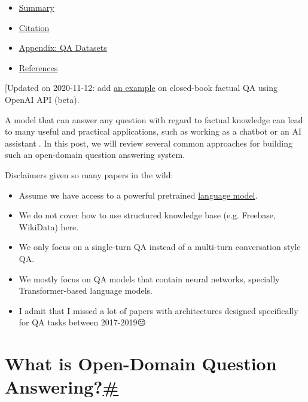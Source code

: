 \begin{itemize}
  \begin{itemize}
  \tightlist
  \item
    \hyperref[fast-maximum-inner-product-search-mips]{Fast Maximum Inner Product Search (MIPS)}
  \item
    \hyperref[language-model-pre-training]{Language Model Pre-training}
  \end{itemize}
\item
  \hyperref[summary]{Summary}
\item
  \hyperref[citation]{Citation}
\item
  \hyperref[appendix-qa-datasets]{Appendix: QA Datasets}
\item
  \hyperref[references]{References}
\end{itemize}

{{[}Updated on 2020-11-12: add \hyperref[openai-api-example]{an example} on closed-book factual QA using OpenAI API (beta).}

A model that can answer any question with regard to factual knowledge can lead to many useful and practical applications, such as working as a chatbot or an AI assistant🤖. In this post, we will review several common approaches for building such an open-domain question answering system.

Disclaimers given so many papers in the wild:

\begin{itemize}
\tightlist
\item
  Assume we have access to a powerful pretrained \href{https://lilianweng.github.io/posts/2019-01-31-lm/}{language model}.
\item
  We do not cover how to use structured knowledge base (e.g. Freebase, WikiData) here.
\item
  We only focus on a single-turn QA instead of a multi-turn conversation style QA.
\item
  We mostly focus on QA models that contain neural networks, specially Transformer-based language models.
\item
  I admit that I missed a lot of papers with architectures designed specifically for QA tasks between 2017-2019😔
\end{itemize}

\section{\texorpdfstring{What is Open-Domain Question Answering?\hyperref[what-is-open-domain-question-answering]{\#}}{What is Open-Domain Question Answering?\#}}\label{what-is-open-domain-question-answering}

